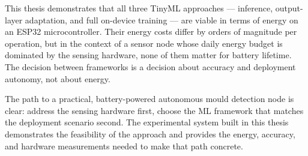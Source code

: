 This thesis demonstrates that all three TinyML approaches --- inference, output-layer adaptation, and full on-device training --- are viable in terms of energy on an ESP32 microcontroller. Their energy costs differ by orders of magnitude per operation, but in the context of a sensor node whose daily energy budget is dominated by the sensing hardware, none of them matter for battery lifetime. The decision between frameworks is a decision about accuracy and deployment autonomy, not about energy.

The path to a practical, battery-powered autonomous mould detection node is clear: address the sensing hardware first, choose the ML framework that matches the deployment scenario second. The experimental system built in this thesis demonstrates the feasibility of the approach and provides the energy, accuracy, and hardware measurements needed to make that path concrete.

